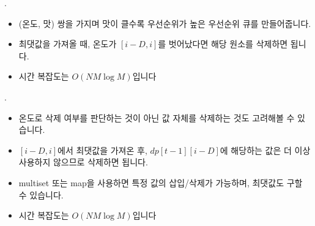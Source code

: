 \begin{frame}{\probno{}. }
    \begin{itemize}
        \item (온도, 맛) 쌍을 가지며 맛이 클수록 우선순위가 높은 우선순위 큐를 만들어줍니다.
        \item 최댓값을 가져올 때, 온도가 $[i-D, i]$를 벗어났다면 해당 원소를 삭제하면 됩니다. 
        \item 시간 복잡도는 $O(NM\log M)$입니다
    \end{itemize}
\end{frame}

\begin{frame}{\probno{}. }
    \begin{itemize}
        \item 온도로 삭제 여부를 판단하는 것이 아닌 값 자체를 삭제하는 것도 고려해볼 수 있습니다.
        \item $[i-D, i]$에서 최댓값을 가져온 후, $dp[t-1][i-D]$에 해당하는 값은 더 이상 사용하지 않으므로 삭제하면 됩니다.
        \item multiset 또는 map을 사용하면 특정 값의 삽입/삭제가 가능하며, 최댓값도 구할 수 있습니다.
        \item 시간 복잡도는 $O(NM\log M)$입니다
    \end{itemize}
\end{frame}